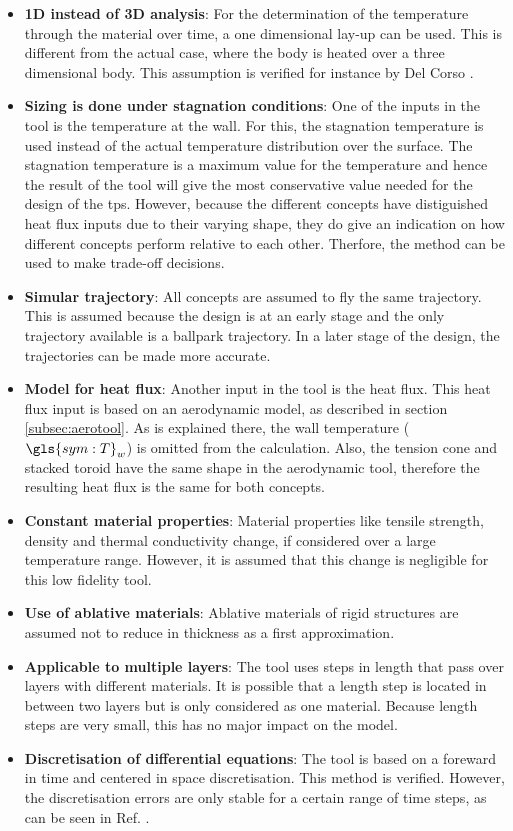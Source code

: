 \begin{itemize}
	\item \textbf{1D instead of 3D analysis}: For the determination of the temperature through the material over time, a one dimensional lay-up can be used. This is different from the actual case, where the body is heated over a three dimensional body. This assumption is verified for instance by Del Corso \cite{Corso2009}.
	\item \textbf{Sizing is done under stagnation conditions}: One of the inputs in the tool is the temperature at the wall. For this, the stagnation temperature is used instead of the actual temperature distribution over the surface. The stagnation temperature is a maximum value for the temperature and hence the result of the tool will give the most conservative value needed for the design of the \gls{tps}. However, because the different concepts have distiguished heat flux inputs due to their varying shape, they do give an indication on how different concepts perform relative to each other. Therfore, the method can be used to make trade-off decisions.
	\item \textbf{Simular trajectory}: All concepts are assumed to fly the same trajectory. This is assumed because the design is at an early stage and the only trajectory available is a ballpark trajectory. In a later stage of the design, the trajectories can be made more accurate. 	
	\item \textbf{Model for heat flux}: Another input in the tool is the heat flux. This heat flux input is based on an aerodynamic model, as described in section \ref{subsec:aerotool}. As is explained there, the wall temperature ($\gls{sym:T}_w$) is omitted from the calculation. Also, the tension cone and stacked toroid have the same shape in the aerodynamic tool, therefore the resulting heat flux is the same for both concepts.
	\item \textbf{Constant material properties}: Material properties like tensile strength, density and thermal conductivity change, if considered over a large temperature range. However, it is assumed that this change is negligible for this low fidelity tool. 
	\item \textbf{Use of ablative materials}: Ablative materials of rigid structures are assumed not to reduce in thickness as a first approximation.
	\item \textbf{Applicable to multiple layers}: The tool uses steps in length that pass over layers with different materials. It is possible that a length step is located in between two layers but is only considered as one material. Because length steps are very small, this has no major impact on the model.
	\item \textbf{Discretisation of differential equations}: The tool is based on a foreward in time and centered in space discretisation. This method is verified. However, the discretisation errors are only stable for a certain range of time steps, as can be seen in Ref. \cite{Smith2011,Holman2002}. 
\end{itemize}

